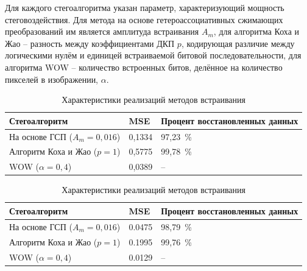Для каждого стегоалгоритма указан параметр, характеризующий мощность стеговоздействия. Для метода на основе гетероассоциативных сжимающих преобразований им является амплитуда встраивания $ A_m $, для алгоритма Коха и Жао – разность между коэффициентами ДКП $ p $, кодирующая различие между логическими нулём и единицей встраиваемой битовой последовательности, для алгоритма WOW – количество встроенных битов, делённое на количество пикселей в изображении, $ \alpha $.

\begin{table}[h!]
\centering
    \begin{tabular}{| l | l | l |}
    \hline
    Стегоалгоритм & MSE & Процент восстановленных данных \\ \hline
    На основе ГСП ($ A_m = 0,016 $) & 0,1334 & 97,23~\% \\ \hline
    Алгоритм Коха и Жао ($ p = 1 $) & 0,5775 & 99,78~\% \\ \hline
    WOW ($ \alpha = 0,4 $) & 0,0389 & – \\ \hline
    \end{tabular}
\caption{Характеристики реализаций методов встраивания}
\label{table:1}
\end{table}

\begin{table}[h!]
\centering
    \begin{tabular}{| l | l | l |}
    \hline
    Стегоалгоритм & MSE & Процент восстановленных данных \\ \hline
    На основе ГСП ($ A_m = 0,016 $) & 0.0475 & 98,79~\% \\ \hline
    Алгоритм Коха и Жао ($ p = 1 $) & 0.1995 & 99,76~\% \\ \hline
    WOW ($ \alpha = 0,4 $) & 0.0129 & – \\ \hline
    \end{tabular}
\caption{Характеристики реализаций методов встраивания}
\label{table:1Color}
\end{table}

